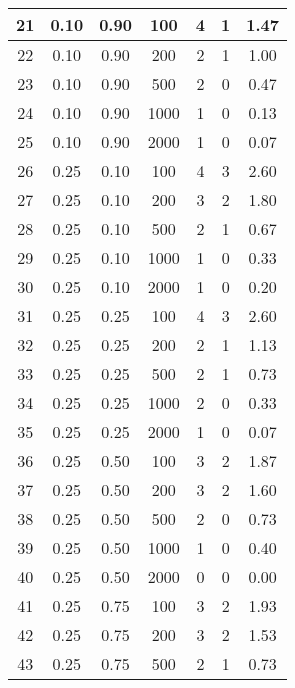 \documentclass[a4paper, 12pt, unknownkeysallowed]{extreport}
\begin{document}
\begin{center}
\begin{longtable}[c]{|c|c|c|c|c|c|c|}
   21 & 0.10 & 0.90 &   100 &    4 &    1 &  1.47 \\ \hline
   22 & 0.10 & 0.90 &   200 &    2 &    1 &  1.00 \\ \hline
   23 & 0.10 & 0.90 &   500 &    2 &    0 &  0.47 \\ \hline
   24 & 0.10 & 0.90 &  1000 &    1 &    0 &  0.13 \\ \hline
   25 & 0.10 & 0.90 &  2000 &    1 &    0 &  0.07 \\ \hline
   26 & 0.25 & 0.10 &   100 &    4 &    3 &  2.60 \\ \hline
   27 & 0.25 & 0.10 &   200 &    3 &    2 &  1.80 \\ \hline
   28 & 0.25 & 0.10 &   500 &    2 &    1 &  0.67 \\ \hline
   29 & 0.25 & 0.10 &  1000 &    1 &    0 &  0.33 \\ \hline
   30 & 0.25 & 0.10 &  2000 &    1 &    0 &  0.20 \\ \hline
   31 & 0.25 & 0.25 &   100 &    4 &    3 &  2.60 \\ \hline
   32 & 0.25 & 0.25 &   200 &    2 &    1 &  1.13 \\ \hline
   33 & 0.25 & 0.25 &   500 &    2 &    1 &  0.73 \\ \hline
   34 & 0.25 & 0.25 &  1000 &    2 &    0 &  0.33 \\ \hline
   35 & 0.25 & 0.25 &  2000 &    1 &    0 &  0.07 \\ \hline
   36 & 0.25 & 0.50 &   100 &    3 &    2 &  1.87 \\ \hline
   37 & 0.25 & 0.50 &   200 &    3 &    2 &  1.60 \\ \hline
   38 & 0.25 & 0.50 &   500 &    2 &    0 &  0.73 \\ \hline
   39 & 0.25 & 0.50 &  1000 &    1 &    0 &  0.40 \\ \hline
   40 & 0.25 & 0.50 &  2000 &    0 &    0 &  0.00 \\ \hline
   41 & 0.25 & 0.75 &   100 &    3 &    2 &  1.93 \\ \hline
   42 & 0.25 & 0.75 &   200 &    3 &    2 &  1.53 \\ \hline
   43 & 0.25 & 0.75 &   500 &    2 &    1 &  0.73 \\ \hline
	\end{longtable}
\end{center}
\end{document}
